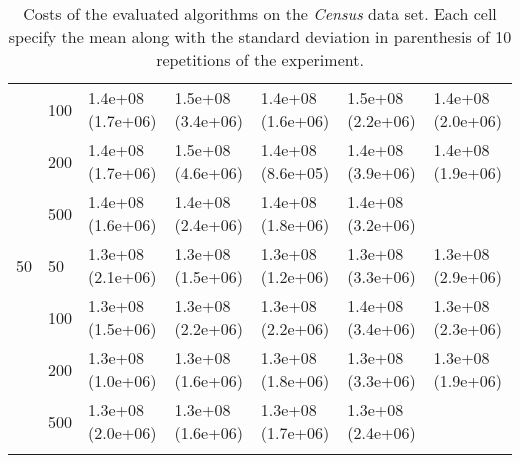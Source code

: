 \begin{longtable}{lllllll}
   & 100 &  1.4e+08 (1.7e+06) &  1.5e+08 (3.4e+06) &  1.4e+08 (1.6e+06) &    1.5e+08 (2.2e+06) &  1.4e+08 (2.0e+06) \\
   & 200 &  1.4e+08 (1.7e+06) &  1.5e+08 (4.6e+06) &  1.4e+08 (8.6e+05) &    1.4e+08 (3.9e+06) &  1.4e+08 (1.9e+06) \\
   & 500 &  1.4e+08 (1.6e+06) &  1.4e+08 (2.4e+06) &  1.4e+08 (1.8e+06) &    1.4e+08 (3.2e+06) &       \\
 \midrule
50 & 50  &  1.3e+08 (2.1e+06) &  1.3e+08 (1.5e+06) &  1.3e+08 (1.2e+06) &    1.3e+08 (3.3e+06) &  1.3e+08 (2.9e+06) \\
   & 100 &  1.3e+08 (1.5e+06) &  1.3e+08 (2.2e+06) &  1.3e+08 (2.2e+06) &    1.4e+08 (3.4e+06) &  1.3e+08 (2.3e+06) \\
   & 200 &  1.3e+08 (1.0e+06) &  1.3e+08 (1.6e+06) &  1.3e+08 (1.8e+06) &    1.3e+08 (3.3e+06) &  1.3e+08 (1.9e+06) \\
   & 500 &  1.3e+08 (2.0e+06) &  1.3e+08 (1.6e+06) &  1.3e+08 (1.7e+06) &    1.3e+08 (2.4e+06) &                 \\
\bottomrule
\caption{Costs of the evaluated algorithms on the \textit{Census} data set. Each cell specify the mean along with the standard deviation in parenthesis of 10 repetitions of the experiment.}
\label{tab:real-cost-mean-std-census}
\end{longtable}

